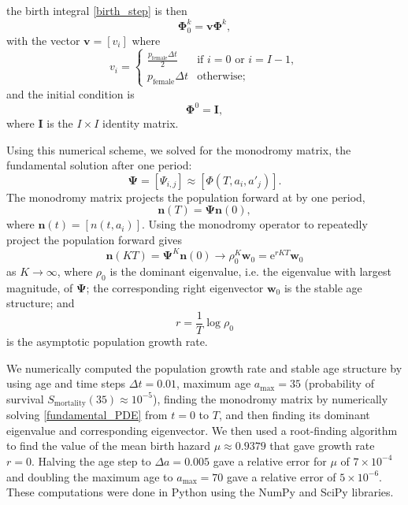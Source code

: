 \documentclass[12pt]{article}
\renewcommand{\vec}[1]{\mathbf{#1}}
\newcommand{\mat}[1]{\mathbf{#1}}
\newcommand{\me}{\mathrm{e}}
\begin{document}
the birth integral \eqref{birth_step} is then
\begin{equation}
  \mat{\Phi}_0^k = \vec{v} \mat{\Phi}^k,
\end{equation}
with the vector $\vec{v} = [v_i]$ where
\begin{equation}
  v_i =
  \begin{cases}
    \frac{p_{\text{female}} \Delta t}{2}
    & \text{if $i = 0$ or $i = I - 1$}, \\
    p_{\text{female}} \Delta t
    & \text{otherwise};
  \end{cases}
\end{equation}
and the initial condition is
\begin{equation}
  \mat{\Phi}^0 = \mat{I},
\end{equation}
where $\mat{I}$ is the $I \times I$ identity matrix.

Using this numerical scheme, we solved for the monodromy matrix, the
fundamental solution after one period:
\begin{equation}
  \mat{\Psi} = [\Psi_{i, j}] \approx [\Phi(T, a_i, a'_j)].
\end{equation}
The monodromy matrix projects the population forward at by one period,
\begin{equation}
  \vec{n}(T) = \mat{\Psi} \vec{n}(0),
\end{equation}
where $\vec{n}(t) = [n(t, a_i)]$.
Using the monodromy operator to repeatedly project the population
forward gives
\begin{equation}
  \vec{n}(K T)
  = \mat{\Psi}^K \vec{n}(0)
  \to \rho_0^K \vec{w}_0
  = \me^{r K T} \vec{w}_0
\end{equation}
as $K \to \infty$,
where $\rho_0$ is the dominant eigenvalue, i.e. the eigenvalue with
largest magnitude, of $\mat{\Psi}$;
the corresponding right eigenvector $\vec{w}_0$ is the stable age
structure; and
\begin{equation}
  r = \frac{1}{T} \log \rho_0
\end{equation}
is the asymptotic population growth rate.

We numerically computed the population growth rate and stable age
structure by using age and time steps $\Delta t = 0.01$,
maximum age $a_{\text{max}} = 35$
(probability of survival
$S_{\text{mortality}}(35) \approx 10^{-5}$),
finding the monodromy matrix by numerically solving
\eqref{fundamental_PDE} from $t = 0$ to $T$, and
then finding its dominant eigenvalue and corresponding eigenvector.
We then used a root-finding algorithm to find the value of the mean
birth hazard $\mu \approx 0.9379$ that gave growth rate $r = 0$.
Halving the age step to $\Delta a = 0.005$
gave a relative error for $\mu$ of $7 \times 10^{-4}$
and doubling the maximum age to $a_{\text{max}} = 70$
gave a relative error of $5 \times 10^{-6}$.
These computations were done in Python \citep{python} using the
NumPy \citep{numpy} and SciPy \citep{scipy} libraries.
\end{document}

